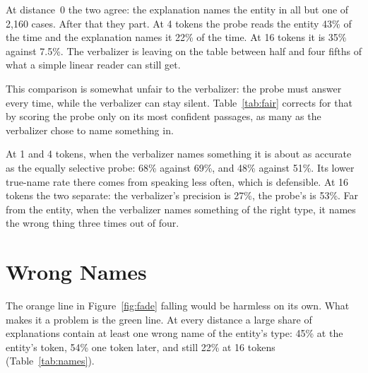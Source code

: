 \begin{table}[t]
\centering
\footnotesize
\setlength{\tabcolsep}{4pt}

\caption[What the explanations name]{What the explanations name, in \% of explanations with 95\% intervals.
Natural text, 540 passages, 8{,}640 explanations. ``Only wrong names'' means the explanation names a wrong
same-type entity and not the true one. The first column is the probe's accuracy on the same passages.}
\label{tab:names}
\end{table}

At distance~0 the two agree: the explanation names the entity in all but one of 2{,}160 cases. After that
they part. At 4 tokens the probe reads the entity 43\% of the time and the explanation names it 22\% of the
time. At 16 tokens it is 35\% against 7.5\%. The verbalizer is leaving on the table between half and four
fifths of what a simple linear reader can still get.

This comparison is somewhat unfair to the verbalizer: the probe must answer every time, while the verbalizer
can stay silent. Table~\ref{tab:fair} corrects for that by scoring the probe only on its most confident
passages, as many as the verbalizer chose to name something in.

\begin{table}[t]
\centering
\small

\caption[The verbalizer against an equally selective probe]{The verbalizer against an equally selective
probe (\%, 95\% intervals; natural text). Precision is the share of naming explanations that name the true
entity. The probe is scored on its most confident passages, as many as the verbalizer chose to name.}
\label{tab:fair}
\end{table}

At 1 and 4 tokens, when the verbalizer names something it is about as accurate as the equally selective
probe: 68\% against 69\%, and 48\% against 51\%. Its lower true-name rate there comes from speaking less
often, which is defensible. At 16
tokens the two separate: the verbalizer's precision is 27\%, the probe's is 53\%. Far from the entity, when
the verbalizer names something of the right type, it names the wrong thing three times out of four.

\section{Wrong Names}
\label{sec:wrongnames}

The orange line in Figure~\ref{fig:fade} falling would be harmless on its own. What makes it a problem is
the green line. At every distance a large share of explanations contain at least one wrong name of the
entity's type: 45\% at the entity's token, 54\% one token later, and still 22\% at 16 tokens
(Table~\ref{tab:names}).

